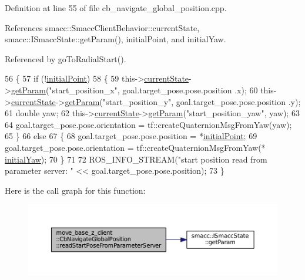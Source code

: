 Definition at line 55 of file cb\+\_\+navigate\+\_\+global\+\_\+position.\+cpp.



References smacc\+::\+Smacc\+Client\+Behavior\+::current\+State, smacc\+::\+I\+Smacc\+State\+::get\+Param(), initial\+Point, and initial\+Yaw.



Referenced by go\+To\+Radial\+Start().


\begin{DoxyCode}
56 \{
57     \textcolor{keywordflow}{if} (!\hyperlink{classmove__base__z__client_1_1CbNavigateGlobalPosition_a603d293ad4557e8332fcfd264d7075d4}{initialPoint})
58     \{
59         this->\hyperlink{classsmacc_1_1SmaccClientBehavior_af76fc9b877542ed5caf033f820c107d0}{currentState}->\hyperlink{classsmacc_1_1ISmaccState_abbb3a24b912c6e8de28f7b86123b6357}{getParam}(\textcolor{stringliteral}{"start\_position\_x"}, goal.target\_pose.pose.position
      .x);
60         this->\hyperlink{classsmacc_1_1SmaccClientBehavior_af76fc9b877542ed5caf033f820c107d0}{currentState}->\hyperlink{classsmacc_1_1ISmaccState_abbb3a24b912c6e8de28f7b86123b6357}{getParam}(\textcolor{stringliteral}{"start\_position\_y"}, goal.target\_pose.pose.position
      .y);
61         \textcolor{keywordtype}{double} yaw;
62         this->\hyperlink{classsmacc_1_1SmaccClientBehavior_af76fc9b877542ed5caf033f820c107d0}{currentState}->\hyperlink{classsmacc_1_1ISmaccState_abbb3a24b912c6e8de28f7b86123b6357}{getParam}(\textcolor{stringliteral}{"start\_position\_yaw"}, yaw);
63 
64         goal.target\_pose.pose.orientation = tf::createQuaternionMsgFromYaw(yaw);
65     \}
66     \textcolor{keywordflow}{else}
67     \{
68         goal.target\_pose.pose.position = *\hyperlink{classmove__base__z__client_1_1CbNavigateGlobalPosition_a603d293ad4557e8332fcfd264d7075d4}{initialPoint};
69         goal.target\_pose.pose.orientation = tf::createQuaternionMsgFromYaw(*
      \hyperlink{classmove__base__z__client_1_1CbNavigateGlobalPosition_a339ec9b992e2565f404d8a2fa8a5be87}{initialYaw});
70     \}
71 
72     ROS\_INFO\_STREAM(\textcolor{stringliteral}{"start position read from parameter server: "} << goal.target\_pose.pose.position);
73 \}
\end{DoxyCode}


Here is the call graph for this function\+:
\nopagebreak
\begin{figure}[H]
\begin{center}
\leavevmode
\includegraphics[width=350pt]{classmove__base__z__client_1_1CbNavigateGlobalPosition_a866ea02c9e25ac1df9df88272deb04b3_cgraph}
\end{center}
\end{figure}




